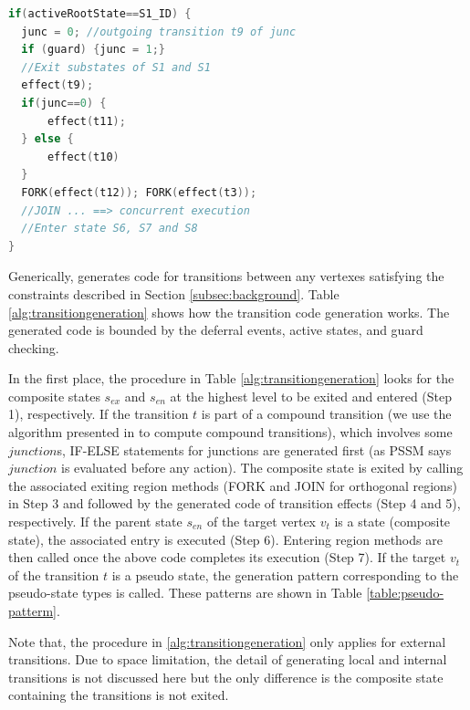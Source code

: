 \begin{lstlisting}[caption=Example code generated for $Fork1$ and $junc$, label=lst:event1, language=C++,frame=none]
if(activeRootState==S1_ID) {
  junc = 0; //outgoing transition t9 of junc
  if (guard) {junc = 1;}
  //Exit substates of S1 and S1
  effect(t9);
  if(junc==0) {
	  effect(t11);
  } else {
	  effect(t10)
  }
  FORK(effect(t12)); FORK(effect(t3)); 
  //JOIN ... ==> concurrent execution
  //Enter state S6, S7 and S8
}
\end{lstlisting}


Generically,  generates code for transitions between any vertexes satisfying the constraints described in Section \ref{subsec:background}. Table \ref{alg:transitiongeneration} shows how the transition code generation works. The generated code is bounded by the deferral events, active states, and guard checking.

In the first place, the procedure in Table \ref{alg:transitiongeneration} looks for the composite states $s_{ex}$ and $s_{en}$ at the highest level to be exited and entered (Step 1), respectively. 
If the transition $t$ is part of a compound transition (we use the algorithm presented in \cite{balser2004interactive,Knapp2004} to compute compound transitions), which involves some $junction$s, IF-ELSE statements for junctions are generated first (as PSSM says $junction$ is evaluated before any action). 
The composite state is exited by calling the associated exiting region methods (FORK and JOIN for orthogonal regions) in Step 3 and followed by the generated code of transition effects (Step 4 and 5), respectively. 
If the parent state $s_{en}$ of the target vertex $v_t$ is a state (composite state), the associated entry is executed (Step 6).
Entering region methods are then called once the above code completes its execution (Step 7). 
If the target $v_t$ of the transition $t$ is a pseudo state, the generation pattern corresponding to the pseudo-state types is called. These patterns are shown in Table \ref{table:pseudo-patterm}.

Note that, the procedure in \ref{alg:transitiongeneration} only applies for external transitions. Due to space limitation, the detail of generating local and internal transitions is not discussed here but the only difference is the composite state containing the transitions is not exited.

